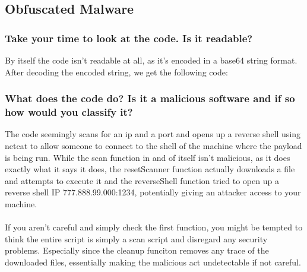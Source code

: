 \subsection{Obfuscated Malware}
\subsubsection{Take your time to look at the code. Is it readable?}
By itself the code isn't readable at all, as it's encoded in a base64 string format. After decoding the encoded string, we get the following code:

\subsubsection{What does the code do? Is it a malicious software and if so how would you classify it?}
The code seemingly scans for an ip and a port and opens up a reverse shell using netcat to allow someone to connect to the shell of the machine where the payload is being run. While the scan function in and of itself isn't malicious, as it does exactly what it says it does, the resetScanner function actually downloads a file and attempts to execute it and the reverseShell function tried to open up a reverse shell IP 777.888.99.000:1234, potentially giving an attacker access to your machine.
\\\\
If you aren't careful and simply check the first function, you might be tempted to think the entire script is simply a scan script and disregard any security problems. Especially since the cleanup funciton removes any trace of the downloaded files, essentially making the malicious act undetectable if not careful.